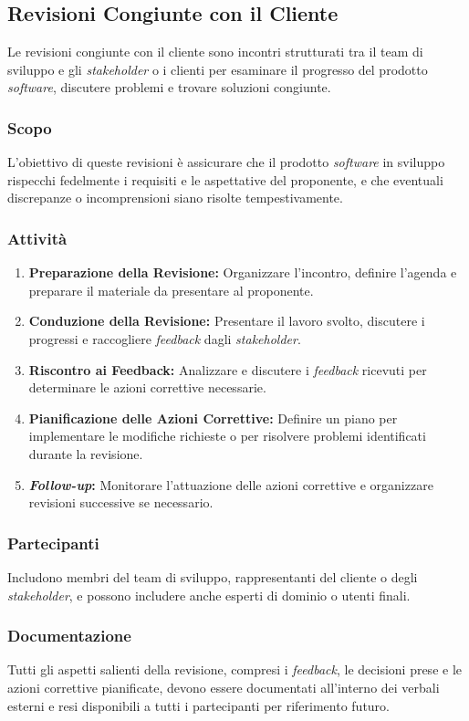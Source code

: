 \subsection{Revisioni Congiunte con il Cliente}

Le revisioni congiunte con il cliente sono incontri strutturati tra il team di
sviluppo e gli \textit{stakeholder} o i clienti per esaminare il progresso del
prodotto \textit{software}, discutere problemi e trovare soluzioni congiunte.

\subsubsection{Scopo}
L'obiettivo di queste revisioni è assicurare che il prodotto \textit{software}
in sviluppo rispecchi fedelmente i requisiti e le aspettative del proponente, e
che eventuali discrepanze o incomprensioni siano risolte tempestivamente.

\subsubsection{Attività}
\begin{enumerate}
	\item \textbf{Preparazione della Revisione:} Organizzare l'incontro,
	      definire l'agenda e preparare il materiale da presentare al
	      proponente.
	\item \textbf{Conduzione della Revisione:} Presentare il lavoro svolto,
	      discutere i progressi e raccogliere \textit{feedback} dagli
	      \textit{stakeholder}.
	\item \textbf{Riscontro ai Feedback:} Analizzare e discutere i
	      \textit{feedback} ricevuti per determinare le azioni correttive
	      necessarie.
	\item \textbf{Pianificazione delle Azioni Correttive:} Definire un piano per
	      implementare le modifiche richieste o per risolvere problemi
	      identificati durante la revisione.
	\item \textbf{\textit{Follow-up}:} Monitorare l'attuazione delle azioni
	      correttive e organizzare revisioni successive se necessario.
\end{enumerate}

\subsubsection{Partecipanti}
Includono membri del team di sviluppo, rappresentanti del cliente o degli
\textit{stakeholder}, e possono includere anche esperti di dominio o utenti
finali.

\subsubsection{Documentazione}
Tutti gli aspetti salienti della revisione, compresi i \textit{feedback}, le
decisioni prese e le azioni correttive pianificate, devono essere documentati
all'interno dei verbali esterni e resi disponibili a tutti i partecipanti per
riferimento futuro.
